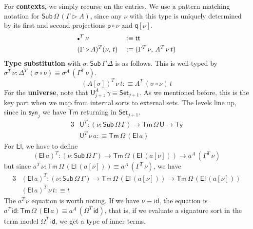 \documentclass[12pt,a4paper,twoside,openany]{book}
\theoremstyle{remark}
\theoremstyle{definition}
\theoremstyle{theorem}
\newcommand{\id}{\mathsf{id}}
\newcommand{\Sub}{\mathsf{Sub}}
\newcommand{\Tm}{\mathsf{Tm}}
\newcommand{\Ty}{\mathsf{Ty}}
\newcommand{\U}{\mathsf{U}}
\newcommand{\El}{\mathsf{El}}
\renewcommand{\tt}{\mathsf{tt}}
\newcommand{\Set}{\mathsf{Set}}
\newcommand{\ext}{\triangleright}
\newcommand{\emptycon}{\scaleobj{.75}\bullet}
\newcommand{\p}{\mathsf{p}}
\newcommand{\q}{\mathsf{q}}
\newcommand{\syn}{\mathsf{syn}}
\newcommand{\defn}{:\equiv}
\begin{document}
For \textbf{contexts}, we simply recurse on the entries. We use a pattern
matching notation for
$\Sub\,\Omega\,(\Gamma\ext A)$, since any $\nu$ with
this type is uniquely determined by its first and second projections
$\p\circ\nu$ and $\q[\nu]$.
\begin{alignat*}{3}
  &\emptycon^T\,\nu           &&\defn \tt\\
  &(\Gamma \ext A)^T(\nu,\,t) &&\defn (\Gamma^T\,\nu,\,A^T\,\nu\,t)
\end{alignat*}
\textbf{Type substitution} with $\sigma : \Sub\,\Gamma\,\Delta$ is as follows. This is well-typed by
$\sigma^T\,\nu : \Delta^T\,(\sigma \circ \nu) \equiv \sigma^A\,(\Gamma^T\,\nu)$.
\[ (A[\sigma])^T\,\nu\,t \defn A^T\,(\sigma\circ\nu)\,t \]
For the \textbf{universe}, note that $\U^A_{j+1}\,\gamma \equiv \Set_{j+1}$.  As we
mentioned before, this is the key part when we map from internal sorts to
external sets. The levels line up, since in $\syn_j$ we have $\Tm$ returning in $\Set_{j+1}$.
\begin{alignat*}{3}
  &\U^T : (\nu : \Sub\,\Omega\,\Gamma) \to \Tm\,\Omega\,\U \to
          \Ty\\
  &\U^T\,\nu\,a \defn \Tm\,\Omega\,(\El\,a)
\end{alignat*}
For $\El$, we have to define
\[
  (\El\,a)^T : (\nu : \Sub\,\Omega\,\Gamma)
          \to \Tm\,\Omega\,(\El\,(a[\nu])) \to a^A\,(\Gamma^T\,\nu)
\]
but since $a^T\,\nu : \Tm\,\Omega\,(\El\,(a[\nu]))
      \equiv a^A\,(\Gamma^T\,\nu)$, we have
\begin{alignat*}{3}
  &(\El\,a)^T : (\nu : \Sub\,\Omega\,\Gamma)
          \to \Tm\,\Omega\,(\El\,(a[\nu])) \to \Tm\,\Omega\,(\El\,(a[\nu]))\\
  &(\El\,a)^T\,\nu\,t \defn t
\end{alignat*}
The $a^T\,\nu$ equation is worth noting. If we have $\nu \equiv \id$, the
equation is $a^T\,\id : \Tm\,\Omega\,(\El\,a) \equiv
a^A\,(\Omega^T\,\id)$, that is, if we evaluate a signature sort in the term
model $\Omega^T\,\id$, we get a type of inner terms.
\end{document}
